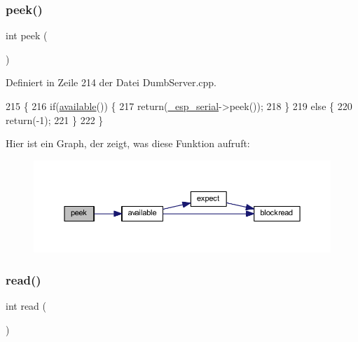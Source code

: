 \subsubsection{\texorpdfstring{peek()}{peek()}}
{\footnotesize\ttfamily int peek (\begin{DoxyParamCaption}{ }\end{DoxyParamCaption})\hspace{0.3cm}{\ttfamily [virtual]}}



Definiert in Zeile 214 der Datei Dumb\+Server.\+cpp.


\begin{DoxyCode}
215 \{
216   \textcolor{keywordflow}{if}(\hyperlink{class_esp_server_a4549a76725f2e4c013e4d57018366109}{available}()) \{
217     \textcolor{keywordflow}{return}(\hyperlink{class_esp_server_a552aab874ad99b696f4c997d6f5a4746}{\_esp\_serial}->peek());
218   \}
219   \textcolor{keywordflow}{else} \{
220     \textcolor{keywordflow}{return}(-1);
221   \}
222 \}
\end{DoxyCode}
Hier ist ein Graph, der zeigt, was diese Funktion aufruft\+:\nopagebreak
\begin{figure}[H]
\begin{center}
\leavevmode
\includegraphics[width=350pt]{class_esp_server_a9040fa1d479d71edf3a826f4691c35c4_cgraph}
\end{center}
\end{figure}
\mbox{\label{class_esp_server_aaab5dab5b969a87f538242e524431637}} 
\subsubsection{\texorpdfstring{read()}{read()}}
{\footnotesize\ttfamily int read (\begin{DoxyParamCaption}{ }\end{DoxyParamCaption})\hspace{0.3cm}{\ttfamily [virtual]}}



